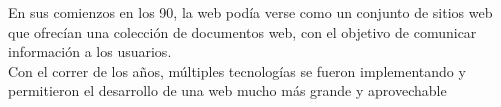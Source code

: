En sus comienzos en los 90, la web podía verse como un conjunto de sitios web que ofrecían una colección de documentos web, con el objetivo de comunicar información a los usuarios.\\
Con el correr de los años, múltiples tecnologías se fueron implementando y permitieron el desarrollo de una web mucho más grande y aprovechable